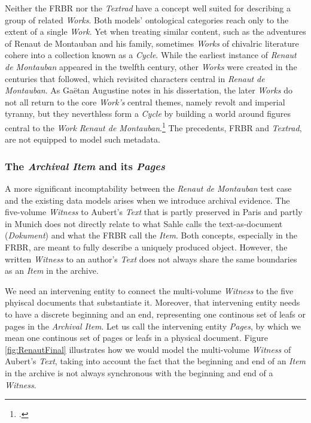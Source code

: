 Neither the FRBR nor the \textit{Textrad} have a concept well suited for describing a group of related \textit{Works}. Both models' ontological categories reach only to the extent of a single \textit{Work}. Yet when treating similar content, such as the adventures of Renaut de Montauban and his family, sometimes \textit{Works} of chivalric literature cohere into a collection known as a \textit{Cycle}. While the earliest instance of \textit{Renaut de Montauban} appeared in the twelfth century, other \textit{Works} were created in the centuries that followed, which revisited characters central in \textit{Renaut de Montauban}. As Gaëtan Augustine notes in his dissertation, the later \textit{Works} do not all return to the core \textit{Work's} central themes, namely revolt and imperial tyranny, but they neverthless form a \textit{Cycle} by building a world around figures central to the \textit{Work} \textit{Renaut de Montauban}.\footcite[][]{Augustine2020} The precedents, FRBR and \textit{Textrad}, are not equipped to model such metadata.

\subsubsection{The \textit{Archival Item} and its \textit{Pages}}

A more significant incomptability between the \textit{Renaut de Montauban} test case and the existing data models arises when we introduce archival evidence. The five-volume \textit{Witness} to Aubert's \textit{Text} that is partly preserved in Paris and partly in Munich does not directly relate to what Sahle calls the text-as-document (\textit{Dokument}) and what the FRBR call the \textit{Item}. Both concepts, especially in the FRBR, are meant to fully describe a uniquely produced object. However, the written \textit{Witness} to an author's \textit{Text} does not always share the same boundaries as an \textit{Item} in the archive.

We need an intervening entity to connect the multi-volume \textit{Witness} to the five phyiscal documents that substantiate it. Moreover, that intervening entity needs to have a discrete beginning and an end, representing one continous set of leafs or pages in the \textit{Archival Item}. Let us call the intervening entity \textit{Pages}, by which we mean one continous set of pages or leafs in a physical document. Figure \ref{fig:RenautFinal} illustrates how we would model the multi-volume \textit{Witness} of Aubert's \textit{Text}, taking into account the fact that the beginning and end of an \textit{Item} in the archive is not always synchronous with the beginning and end of a \textit{Witness}.

